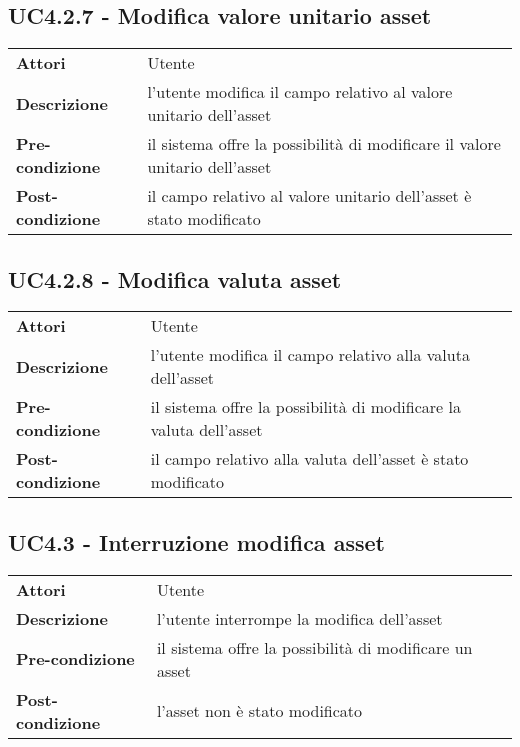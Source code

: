 \subsection{UC4.2.7 - Modifica valore unitario asset}
\label{sssec:UC4.2.7}
\def\arraystretch{1.5}
\begin{tabularx}{\textwidth}{l|p{}}
\rowcolor{I} \multicolumn{2}{c}{\color{white}\textbf{UC4.2.7 - Modifica valore unitario asset}} \\
\toprule
\endhead
\textbf{Attori} & Utente\\
\textbf{Descrizione} & l'utente modifica il campo relativo al valore unitario dell'asset\\
\textbf{Pre-condizione} & il sistema offre la possibilità di modificare il valore unitario dell'asset\\
\textbf{Post-condizione} & il campo relativo al valore unitario dell'asset è stato modificato\\
\bottomrule
\end{tabularx}
\subsection{UC4.2.8 - Modifica valuta asset}
\label{sssec:UC4.2.8}
\def\arraystretch{1.5}
\begin{tabularx}{\textwidth}{l|p{}}
\rowcolor{I} \multicolumn{2}{c}{\color{white}\textbf{UC4.2.8 - Modifica valuta asset}} \\
\toprule
\endhead
\textbf{Attori} & Utente\\
\textbf{Descrizione} & l'utente modifica il campo relativo alla valuta dell'asset\\
\textbf{Pre-condizione} & il sistema offre la possibilità di modificare la valuta dell'asset\\
\textbf{Post-condizione} & il campo relativo alla valuta dell'asset è stato modificato\\
\bottomrule
\end{tabularx}
\subsection{UC4.3 - Interruzione modifica asset}
\label{sssec:UC4.3}
\def\arraystretch{1.5}
\begin{tabularx}{\textwidth}{l|p{}}
\rowcolor{I} \multicolumn{2}{c}{\color{white}\textbf{UC4.3 - Interruzione modifica asset}} \\
\toprule
\endhead
\textbf{Attori} & Utente\\
\textbf{Descrizione} & l'utente interrompe la modifica dell'asset\\
\textbf{Pre-condizione} & il sistema offre la possibilità di modificare un asset\\
\textbf{Post-condizione} & l'asset non è stato modificato\\
\bottomrule
\end{tabularx}
